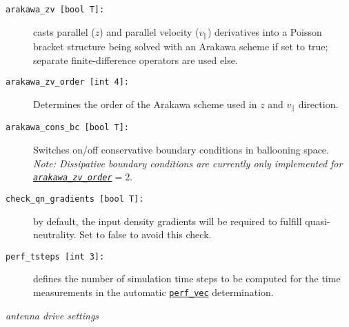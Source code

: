\documentclass[12pt]{article}
\begin{document}
\begin{description}
\item[\hypertarget{arakawa_zv}{\tt arakawa\_zv [bool T]:}] casts parallel ($z$) and parallel velocity ($v_\|$)
derivatives into a Poisson bracket structure being solved with an Arakawa scheme\cite{Arakawa66} if set to true; separate
finite-difference operators are used else.
\item[\hypertarget{arakawa_zv_order}{\tt arakawa\_zv\_order [int 4]:}] Determines the order of the Arakawa scheme used in $z$ and $v_\|$ direction.
\item[\hypertarget{arakawa_cons_bc}{\tt arakawa\_cons\_bc [bool T]:}] Switches on/off conservative boundary conditions in ballooning space. {\em Note: Dissipative boundary conditions are currently only implemented for \hyperlink{arakawa_zv_order}{\tt arakawa\_zv\_order}$=2$}.
\item[\hypertarget{check_qn_gradients}{\tt check\_qn\_gradients [bool T]:}] by default, the input density gradients will be required to fulfill quasi-neutrality. Set to false to avoid this check.
\item[\texttt{perf\_tsteps [int 3]:}] defines the number of simulation time steps to be computed for the
time measurements in the automatic \hyperlink{perf_vec}{\tt perf\_vec} determination.
\end{description}
%
{\noindent\em antenna drive settings}
\end{document}
